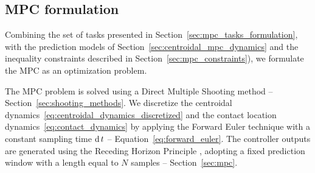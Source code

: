 \subsection{MPC formulation}
\label{sec:mpc_formulation}
Combining the set of tasks presented in Section~\ref{sec:mpc_tasks_formulation}, with the prediction models of Section~\ref{sec:centroidal_mpc_dynamics} and the inequality constraints described in Section~\ref{sec:mpc_constraints}), we formulate the MPC as an optimization problem. 
\par
The MPC problem is solved using a Direct Multiple Shooting method \citep{BettsPractical2010} -- Section~\ref{sec:shooting_methods}. We discretize the centroidal dynamics~\eqref{eq:centroidal_dynamics_discretized} and the contact location dynamics~\eqref{eq:contact_dynamics} by applying the Forward Euler technique with a constant sampling time $\operatorname{d} t$ -- Equation~\eqref{eq:forward_euler}. The controller outputs are generated using the Receding Horizon Principle \citep{Mayne90MPC}, adopting a fixed prediction window with a length equal to $N$ samples -- Section~\ref{sec:mpc}.

